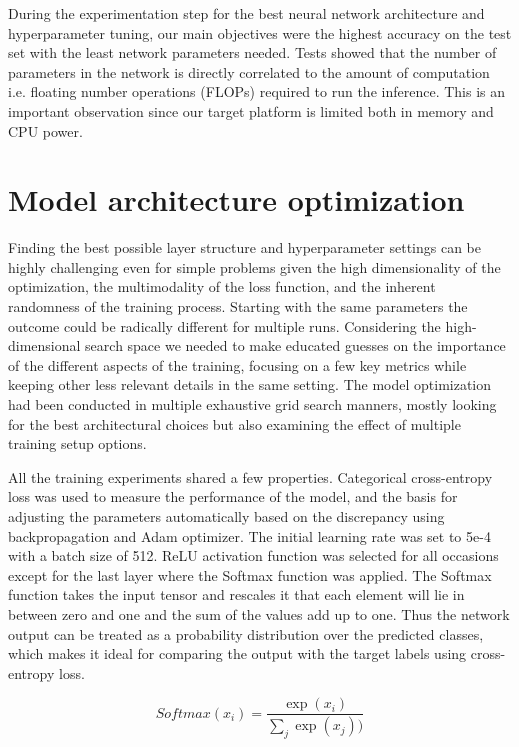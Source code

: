 During the experimentation step for the best neural network architecture and hyperparameter tuning, our main objectives were the highest accuracy on the test set with the least network parameters needed. Tests showed that the number of parameters in the network is directly correlated to the amount of computation i.e. floating number operations (FLOPs) required to run the inference. This is an important observation since our target platform is limited both in memory and CPU power. 

\section{Model architecture optimization}

Finding the best possible layer structure and hyperparameter settings can be highly challenging even for simple problems given the high dimensionality of the optimization, the multimodality of the loss function, and the inherent randomness of the training process. Starting with the same parameters the outcome could be radically different for multiple runs. Considering the high-dimensional search space we needed to make educated guesses on the importance of the different aspects of the training, focusing on a few key metrics while keeping other less relevant details in the same setting. The model optimization had been conducted in multiple exhaustive grid search manners, mostly looking for the best architectural choices but also examining the effect of multiple training setup options.

All the training experiments shared a few properties. Categorical cross-entropy loss was used to measure the performance of the model, and the basis for adjusting the parameters automatically based on the discrepancy using backpropagation and Adam optimizer. The initial learning rate was set to 5e-4 with a batch size of 512. ReLU activation function was selected for all occasions except for the last layer where the Softmax function was applied. The Softmax function takes the input tensor and rescales it that each element will lie in between zero and one and the sum of the values add up to one. Thus the network output can be treated as a probability distribution over the predicted classes, which makes it ideal for comparing the output with the target labels using cross-entropy loss.


\begin{equation}
    Softmax(x_i) = \frac{\exp(x_i)}{\sum_{j}^{ }\exp(x_j))}
\end{equation}


